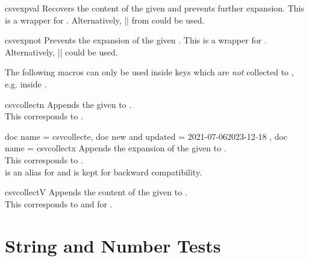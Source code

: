 \documentclass[a4paper,11pt]{ltxdoc}
\begin{document}
\begin{docCommand}[doc new and updated={2021-07-06}{2023-12-17}]{csvexpval}{}
  Recovers the content of the given  and prevents further
  expansion. This is a wrapper for .
  Alternatively, |\expandonce| from  could be used.
\end{docCommand}


\begin{docCommand}[doc new=2021-07-06]{csvexpnot}{}
  Prevents the expansion of the given . This is a wrapper
  for .
  Alternatively, |\noexpand| could be used.
\end{docCommand}

The following macros can only be used inside keys which are \emph{not}
collected to , e.g. inside .

\begin{docCommand}[doc new and updated={2021-07-06}{2023-12-17}]{csvcollectn}{}
  Appends the given  to .\\
  This corresponds to .
\end{docCommand}


\begin{docCommands}[
      doc parameter = \marg{code}
    ]
  {
    { doc name = csvcollecte, doc new and updated = {2021-07-06}{2023-12-18} },
    { doc name = csvcollectx }
  }
  Appends the expansion of the given  to .\\
  This corresponds to .\\
   is an alias for  and is kept for backward compatibility.
\end{docCommands}

\begin{docCommand}[doc new and updated={2021-07-06}{2023-12-17}]{csvcollectV}{}
  Appends the content of the given  to .\\
  This corresponds to  and  for
  .
\end{docCommand}


\clearpage
\section{String and Number Tests}\label{sec:stringtests}%
\end{document}
